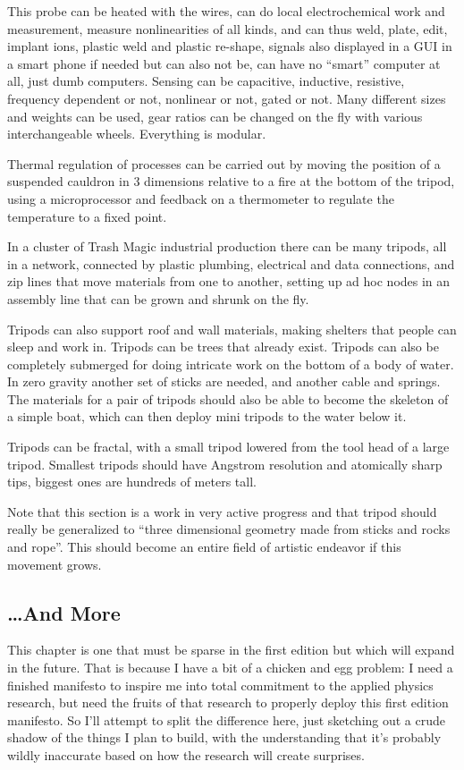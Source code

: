 This probe can be heated with the wires, can do local electrochemical
work and measurement, measure nonlinearities of all kinds, and can thus
weld, plate, edit, implant ions, plastic weld and plastic re-shape,
signals also displayed in a GUI in a smart phone if needed but can also
not be, can have no ``smart'' computer at all, just dumb computers.
Sensing can be capacitive, inductive, resistive, frequency dependent or
not, nonlinear or not, gated or not. Many different sizes and weights
can be used, gear ratios can be changed on the fly with various
interchangeable wheels. Everything is modular.

Thermal regulation of processes can be carried out by moving the
position of a suspended cauldron in 3 dimensions relative to a fire at
the bottom of the tripod, using a microprocessor and feedback on a
thermometer to regulate the temperature to a fixed point.

In a cluster of Trash Magic industrial production there can be many
tripods, all in a network, connected by plastic plumbing, electrical and
data connections, and zip lines that move materials from one to another,
setting up ad hoc nodes in an assembly line that can be grown and shrunk
on the fly.

Tripods can also support roof and wall materials, making shelters that
people can sleep and work in. Tripods can be trees that already exist.
Tripods can also be completely submerged for doing intricate work on the
bottom of a body of water. In zero gravity another set of sticks are
needed, and another cable and springs. The materials for a pair of
tripods should also be able to become the skeleton of a simple boat,
which can then deploy mini tripods to the water below it.

Tripods can be fractal, with a small tripod lowered from the tool head
of a large tripod. Smallest tripods should have Angstrom resolution and
atomically sharp tips, biggest ones are hundreds of meters tall.

Note that this section is a work in very active progress and that tripod
should really be generalized to ``three dimensional geometry made from
sticks and rocks and rope''. This should become an entire field of
artistic endeavor if this movement grows.

\subsection{\ldots{}And More}\label{and-more}

This chapter is one that must be sparse in the first edition but which
will expand in the future. That is because I have a bit of a chicken and
egg problem: I need a finished manifesto to inspire me into total
commitment to the applied physics research, but need the fruits of that
research to properly deploy this first edition manifesto. So I'll
attempt to split the difference here, just sketching out a crude shadow
of the things I plan to build, with the understanding that it's probably
wildly inaccurate based on how the research will create surprises.
